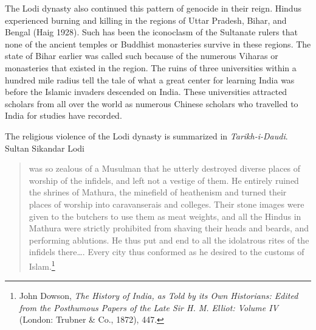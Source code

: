 The Lodi dynasty also continued this pattern of genocide in their reign. Hindus experienced burning and killing in the regions of Uttar Pradesh, Bihar, and Bengal (Haig 1928). Such has been the iconoclasm of the Sultanate rulers that none of the ancient temples or Buddhist monasteries survive in these regions. The state of Bihar earlier was called such because of the numerous Viharas or monasteries that existed in the region. The ruins of three universities within a hundred mile radius tell the tale of what a great center for learning India was before the Islamic invaders descended on India. These universities attracted scholars from all over the world as numerous Chinese scholars who travelled to India for studies have recorded. 

The religious violence of the Lodi dynasty is summarized in \textit{Tarikh-i-Daudi}. Sultan Sikandar Lodi
\begin{quote}
was so zealous of a Musulman that he utterly destroyed diverse places of worship of the infidels, and left not a vestige of them. He entirely ruined the shrines of Mathura, the minefield of heathenism and turned their places of worship into caravanserais and colleges. Their stone images were given to the butchers to use them as meat weights, and all the Hindus in Mathura were strictly prohibited from shaving their heads and beards, and performing ablutions. He thus put and end to all the idolatrous rites of the infidels there…. Every city thus conformed as he desired to the customs of Islam.\footnote{John Dowson, \textit{The History of India, as Told by its Own Historians: Edited from the Posthumous Papers of the Late Sir H. M. Elliot: Volume IV} (London: Trubner \& Co., 1872), 447.} 
\end{quote}
